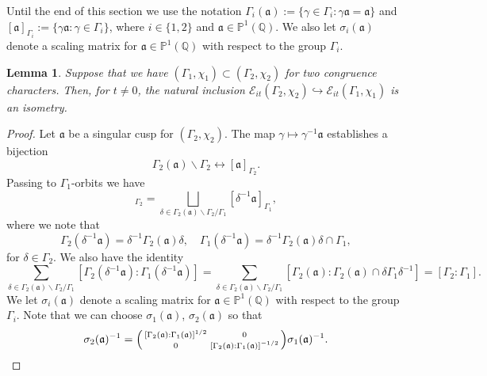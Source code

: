 \documentclass{article}
\newtheorem{lem}[thm]{Lemma}
\theoremstyle{named}
\newcommand{\E}{\mathcal{E}}
\newcommand{\Q}{\mathbb{Q}}
\renewcommand{\a}{\mathfrak{a}}
\renewcommand{\P}{\mathbb{P}}
\begin{document}
Until the end of this section we use the notation $\Gamma_i(\a) := \{\gamma \in \Gamma_i : \gamma \a = \a\}$ and $[\a]_{\Gamma_i} := \{\gamma \a : \gamma \in \Gamma_i\}$, where $i \in \{1, 2\}$ and $\a \in \P^1(\Q)$. We also let $\sigma_i(\a)$ denote a scaling matrix for $\a \in \P^1(\Q)$ with respect to the group $\Gamma_i$. 
\begin{lem}
Suppose that we have $(\Gamma_1, \chi_1)\subset (\Gamma_2, \chi_2)$ for two congruence characters. Then, for $t \neq 0$, the natural inclusion $\E_{it}(\Gamma_2, \chi_2) \hookrightarrow \E_{it}(\Gamma_1, \chi_1)$ is an isometry.
\end{lem}
\begin{proof}
Let $\a$ be a singular cusp for $(\Gamma_2, \chi_2)$.  The map $\gamma \mapsto \gamma^{-1}\a$ establishes a bijection
\begin{equation*}
    \Gamma_2(\a)\backslash \Gamma_2 \leftrightarrow [\a]_{\Gamma_2}.
\end{equation*}
Passing to $\Gamma_1$-orbits we have 
\begin{equation*}
    [\a]_{\Gamma_2} = \bigsqcup_{\delta \in \Gamma_2(\a)\backslash \Gamma_2 /\Gamma_1} [\delta^{-1}\a]_{\Gamma_1}, 
\end{equation*}
where we note that
\begin{equation}\label{eq:relationstabilizers}
    \Gamma_2(\delta^{-1}\a) = \delta^{-1}\Gamma_2(\a)\delta, \quad 
    \Gamma_1(\delta^{-1} \a) = \delta^{-1}\Gamma_2(\a)\delta \cap \Gamma_1,
\end{equation}
for $\delta \in \Gamma_2$. We also have the identity
\begin{equation}\label{eq:sumofrelativewidthofcusps}
    \sum_{\delta \in \Gamma_2(\a) \backslash \Gamma_2/\Gamma_1}[\Gamma_2(\delta^{-1}\a): \Gamma_1(\delta^{-1}\a)] =  \sum_{\delta \in \Gamma_2(\a) \backslash \Gamma_2/\Gamma_1}[\Gamma_2(\a): \Gamma_2(\a) \cap \delta\Gamma_1 \delta^{-1}] = [\Gamma_2: \Gamma_1].
\end{equation}
We let $\sigma_i(\a)$ denote a scaling matrix for $\a \in \P^1(\Q)$ with respect to the group $\Gamma_i$. Note that we can choose $\sigma_1(\a)$, $\sigma_2(\a)$ so that 
\begin{equation}\label{eq:relationscalingmatrix}
    \sigma_2(\a)^{-1} = \begin{psmallmatrix}
        [\Gamma_2(\a): \Gamma_1(\a)]^{1/2}  & 0\\
        0 & [\Gamma_2(\a): \Gamma_1(\a)]^{-1/2} 
    \end{psmallmatrix} \sigma_1(\a)^{-1}.

\end{equation}
\end{proof}
\end{document}
